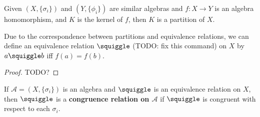 \begin{lemma}
\label{lemma-kernel-of-homomorphism-is-partition}

Given $(X, \{\sigma_i\})$ and $(Y, \{\phi_i\})$ are similar algebras and $f: X \rightarrow Y$ is an algebra homomorphism, and $K$ is the kernel of $f$, then $K$ is a partition of $X$. 

Due to the correspondence between partitions and equivalence relations, we can define an equivalence relation $\squiggle$ (TODO: fix this command) on $X$ by $a \squiggle b$ iff $f(a) = f(b)$.

\end{lemma}

\begin{proof}
TODO?

\end{proof}


\begin{definition}
\label{def-congruence-relation}
If $\mathcal{A} = (X, \{\sigma_i\})$ is an algebra and $\squiggle$ is an equivalence relation on $X$, then $\squiggle$ is a \textbf{congruence relation on $\mathcal{A}$} if $\squiggle$ is congruent with respect to each $\sigma_i$.

\end{definition}


